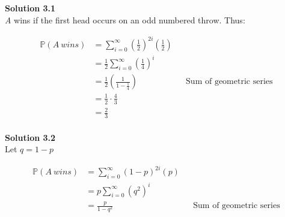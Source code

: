 \documentclass{article}
\newcommand{\prob}{\mathbb{P}}
\begin{document}
	 \textbf{Solution 3.1}
	 \\
	 
	 \textit{A} wins if the first head occurs on an odd numbered throw. Thus:
	 
	 \begin{align*}
	 	\prob \left(A\: wins\right)
	 	&= \sum_{i=0}^{\infty} \left(\frac{1}{2}\right)^{2i} \left(\frac{1}{2}\right)
	 	\\
	 	&= \frac{1}{2} \sum_{i=0}^{\infty} \left(\frac{1}{4}\right)^i
	 	\\
	 	&= \frac{1}{2} \left(\frac{1}{1-\frac{1}{4}}\right) && \text{Sum of geometric series}
	 	\\
	 	&= \frac{1}{2}\cdot \frac{4}{3} 
	 	\\
	 	&= \frac{2}{3}
	 \end{align*}
	 \\
	 
	 \textbf{Solution 3.2}
	 \\
	 
	 Let $q=1-p$
	 
	 \begin{align*}
	 	\prob \left(A\: wins\right)
	 	&= \sum_{i=0}^{\infty} \left(1-p\right)^{2i} \left(p\right)
	 	\\
	 	&= p \sum_{i=0}^{\infty} \left(q^2\right)^i
	 	\\
	 	&= \frac{p}{1-q^2} && \text{Sum of geometric series}
	 \end{align*}
	 
	 
\end{document}
